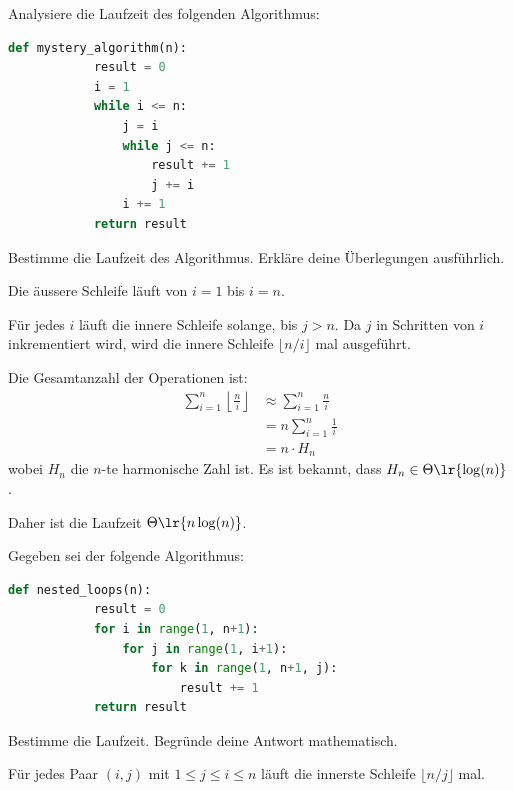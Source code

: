 \begin{questions}
        \question[3] Analysiere die Laufzeit des folgenden Algorithmus:
        \begin{lstlisting}[language=Python]
        def mystery_algorithm(n):
            result = 0
            i = 1
            while i <= n:
                j = i
                while j <= n:
                    result += 1
                    j += i
                i += 1
            return result
        \end{lstlisting}
Bestimme die Laufzeit des Algorithmus. Erkläre deine Überlegungen ausführlich.
            \begin{solution}
                Die äussere Schleife läuft von $i = 1$ bis $i = n$.
                
                Für jedes $i$ läuft die innere Schleife solange, bis $j > n$. Da $j$ in Schritten von $i$ inkrementiert wird, wird die innere Schleife $\lfloor n/i \rfloor$ mal ausgeführt.
                
                Die Gesamtanzahl der Operationen ist:
                \begin{align*}
                    \sum_{i=1}^{n} \left\lfloor \frac{n}{i} \right\rfloor &\approx \sum_{i=1}^{n} \frac{n}{i} \\
                    &= n \sum_{i=1}^{n} \frac{1}{i} \\
                    &= n \cdot H_n
                \end{align*}
                wobei $H_n$ die $n$-te harmonische Zahl ist. Es ist bekannt, dass $H_n \in \Theta\lr{\log(n)}$.
                
                Daher ist die Laufzeit $\Theta\lr{n \log(n)}$.
            \end{solution}


        \question[3] Gegeben sei der folgende Algorithmus:
        \begin{lstlisting}[language=Python]
        def nested_loops(n):
            result = 0
            for i in range(1, n+1):
                for j in range(1, i+1):
                    for k in range(1, n+1, j):
                        result += 1
            return result
        \end{lstlisting}
        Bestimme die Laufzeit. Begründe deine Antwort mathematisch.
            \begin{solution}
                Für jedes Paar $(i, j)$ mit $1 \leq j \leq i \leq n$ läuft die innerste Schleife $\lfloor n/j \rfloor$ mal.
                

\end{solution}
\end{questions}
